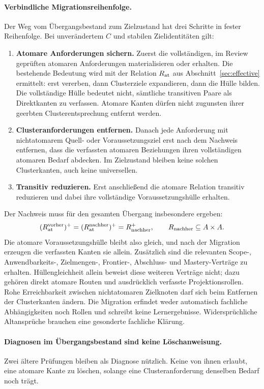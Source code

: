 \paragraph{Verbindliche Migrationsreihenfolge.}
Der Weg vom Übergangsbestand zum Zielzustand hat drei Schritte in fester
Reihenfolge. Bei unverändertem $C$ und stabilen Zielidentitäten gilt:
\begin{enumerate}
 \item \textbf{Atomare Anforderungen sichern.} Zuerst die vollständigen,
 im Review geprüften atomaren Anforderungen materialisieren oder erhalten. Die
 bestehende Bedeutung wird mit der Relation $R_{\mathrm{at}}$ aus
 Abschnitt~\ref{sec:effective} ermittelt: erst vererben, dann Clusterziele
 expandieren, dann die Hülle bilden. Die vollständige Hülle
 bedeutet nicht, sämtliche transitiven Paare als Direktkanten zu verfassen.
 Atomare Kanten dürfen nicht zugunsten ihrer geerbten Clusterentsprechung
 entfernt werden.
 \item \textbf{Clusteranforderungen entfernen.} Danach jede Anforderung mit
 nichtatomarem Quell- oder Voraussetzungsziel erst nach dem Nachweis
 entfernen, dass die verfassten atomaren Beziehungen ihren vollständigen
 atomaren Bedarf abdecken. Im Zielzustand bleiben keine solchen
 Clusterkanten, auch keine universellen.
 \item \textbf{Transitiv reduzieren.} Erst anschließend die atomare Relation
 transitiv reduzieren und dabei ihre vollständige Voraussetzungshülle
 erhalten.
\end{enumerate}
Der Nachweis muss für den gesamten Übergang insbesondere ergeben:
\[
 (R_{\mathrm{at}}^{\mathrm{vorher}})^+
 = (R_{\mathrm{at}}^{\mathrm{nachher}})^+
 = R_{\mathrm{nachher}}^+,\qquad
 R_{\mathrm{nachher}}\subseteq A\times A.
\]
Die atomare Voraussetzungshülle bleibt also gleich, und nach der Migration
erzeugen die verfassten Kanten sie allein. Zusätzlich sind die relevanten
Scope-, Anwendbarkeits-, Zielmengen-, Frontier-, Abschluss- und
Mastery-Verträge zu erhalten. Hüllengleichheit
allein beweist diese weiteren Verträge nicht; dazu gehören direkt atomare
Routen und ausdrücklich verfasste Projektionsrollen. Rohe Erreichbarkeit
zwischen nichtatomaren Zielknoten darf sich beim Entfernen der Clusterkanten
ändern. Die Migration erfindet weder automatisch fachliche Abhängigkeiten
noch Rollen und schreibt keine Lernergebnisse. Widersprüchliche Altansprüche
brauchen eine gesonderte fachliche Klärung.

\paragraph{Diagnosen im Übergangsbestand sind keine Löschanweisung.}
Zwei ältere Prüfungen bleiben als Diagnose nützlich. Keine von ihnen
erlaubt, eine atomare Kante zu löschen, solange eine Clusteranforderung
denselben Bedarf noch trägt.

